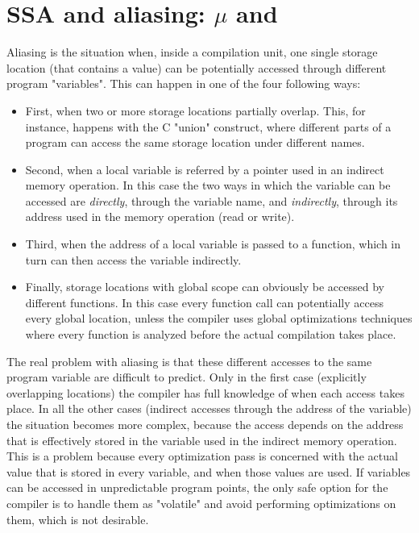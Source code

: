 \section{SSA and aliasing: $\mu$ and \chifuns}
\index{\mufun}\index{\chifun}
Aliasing is the situation when, inside a compilation unit, one single storage location (that contains a value) can be potentially accessed through different program "variables".
This can happen in one of the four following ways:
\begin{itemize}
\item First, when two or more storage locations partially overlap. This, for instance, happens with the C "union" construct, where different parts of a program can access the same storage location under different names.
\item Second, when a local variable is referred by a pointer used in an indirect memory operation. In this case the two ways in which the variable can be accessed are {\em directly}, through the variable name, and {\em indirectly}, through its address used in the memory operation (read or write).
\item Third, when the address of a local variable is passed to a function, which in turn can then access the variable indirectly.
\item Finally, storage locations with global scope can obviously be accessed by different functions. In this case every function call can potentially access every global location, unless the compiler uses global optimizations techniques where every function is analyzed before the actual compilation takes place.
\end{itemize}

The real problem with aliasing is that these different accesses to the same program variable are difficult to predict. Only in the first case (explicitly overlapping locations) the compiler has full knowledge of when each access takes place. In all the other cases (indirect accesses through the address of the variable) the situation becomes more complex, because the access depends on the address that is effectively stored in the variable used in the indirect memory operation.
This is a problem because every optimization pass is concerned with the actual value that is stored in every variable, and when those values are used. If variables can be accessed in unpredictable program points, the only safe option for the compiler is to handle them as "volatile" and avoid performing optimizations on them, which is not desirable.

